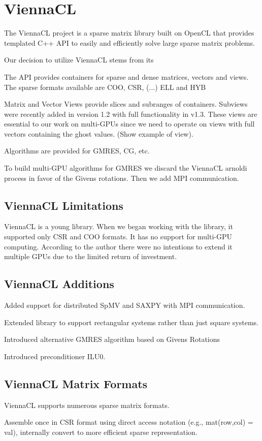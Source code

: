 \chapter{ViennaCL}


The ViennaCL project \cite{Rupp2010a, Rupp2010} is a sparse matrix library built on OpenCL that provides templated C++ API to easily and efficiently solve large sparse matrix problems. 

Our decision to utilize ViennaCL stems from its 

The API provides containers for sparse and dense matrices, vectors and views. The sparse formats available are COO, CSR, (...) ELL and HYB

Matrix and Vector Views provide slices and subranges of containers. Subviews were recently added in version 1.2 with full functionality in v1.3. These views are essential to our work on multi-GPUs since we need to operate on views with full vectors containing the ghost values. (Show example of view). 

Algorithms are provided for GMRES, CG, etc. 

To build multi-GPU algorithms for GMRES we discard the ViennaCL arnoldi process in favor of the Givens rotations. Then we add MPI communication. 



\section{ViennaCL Limitations}
ViennaCL is a young library. When we began working with the library, it supported only CSR and COO formats. It has no support for multi-GPU computing. According to the author there were no intentions to extend it multiple GPUs due to the limited return of investment. 

\section{ViennaCL Additions}
Added support for distributed SpMV and SAXPY with MPI communication. 

Extended library to support rectangular systems rather than just square systems. 

Introduced alternative GMRES algorithm based on Givens Rotations

Introduced preconditioner ILU0. 

\section{ViennaCL Matrix Formats}

ViennaCL supports numerous sparse matrix formats. 

Assemble once in CSR format using direct access notation (e.g., mat(row,col) = val), internally convert to more efficient sparse representation. 
